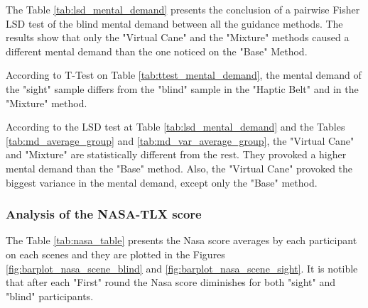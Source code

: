 

The Table \ref{tab:lsd_mental_demand} presents the conclusion of a pairwise Fisher LSD test of the blind mental demand between all the guidance methods. The results show that only the "Virtual Cane" and the "Mixture" methods caused a different mental demand than the one noticed on the "Base" Method.



According to T-Test on Table \ref{tab:ttest_mental_demand}, the mental demand of the "sight" sample differs from the "blind" sample in the "Haptic Belt" and in the "Mixture" method.

According to the LSD test at Table \ref{tab:lsd_mental_demand} and the Tables \ref{tab:md_average_group} and \ref{tab:md_var_average_group}, the "Virtual Cane" and "Mixture" are statistically different from the rest. They provoked a higher mental demand than the "Base" method. Also, the "Virtual Cane" provoked the biggest variance in the mental demand, except only the "Base" method.

\FloatBarrier



\subsubsection{Analysis of the NASA-TLX score}

The Table \ref{tab:nasa_table} presents the Nasa score averages by each participant on each scenes and they are plotted in the Figures \ref{fig:barplot_nasa_scene_blind} and \ref{fig:barplot_nasa_scene_sight}. It is notible that after each "First" round the Nasa score diminishes for both "sight" and "blind" participants.



